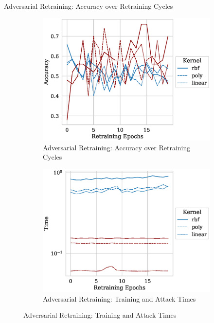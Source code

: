 \documentclass{beamer}
\begin{document}
\begin{frame}{Adversarial Retraining: Accuracy over Retraining Cycles}
  \begin{figure}
    \centering
    \begin{subfigure}[b]{0.45\textwidth}
      \centering
      \includegraphics[width=\textwidth]{./generated/retrain_accuracy.eps}
      \caption{Adversarial Retraining: Accuracy over Retraining Cycles}
    \end{subfigure}
    \centering
    \begin{subfigure}[b]{0.45\textwidth}
      \centering
      \includegraphics[width=\textwidth]{./generated/retrain_time.eps}
      \caption{Adversarial Retraining: Training and Attack Times}
    \end{subfigure}
  \end{figure}
\end{frame}
\end{document}
